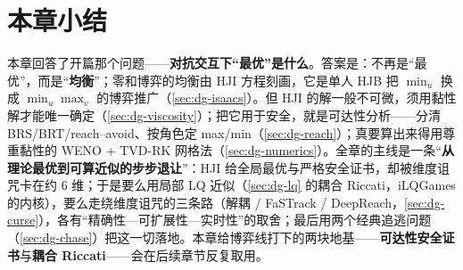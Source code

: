 \section*{本章小结}
本章回答了开篇那个问题——\textbf{对抗交互下“最优”是什么}。答案是：不再是“最优”，而是“\textbf{均衡}”；零和博弈的均衡由 HJI 方程刻画，它是单人 HJB 把 $\min_u$ 换成 $\min_u\max_v$ 的博弈推广（\cref{sec:dg-isaacs}）。但 HJI 的解一般不可微，须用黏性解才能唯一确定（\cref{sec:dg-viscosity}）；把它用于安全，就是可达性分析——分清 BRS/BRT/reach--avoid、按角色定 max/min（\cref{sec:dg-reach}）；真要算出来得用尊重黏性的 WENO + TVD-RK 网格法（\cref{sec:dg-numerics}）。全章的主线是一条“\textbf{从理论最优到可算近似的步步退让}”：HJI 给全局最优与严格安全证书，却被维度诅咒卡在约 6 维；于是要么用局部 LQ 近似（\cref{sec:dg-lq} 的耦合 Riccati，iLQGames 的内核），要么走绕维度诅咒的三条路（解耦 / FaSTrack / DeepReach，\cref{sec:dg-curse}），各有“精确性—可扩展性—实时性”的取舍；最后用两个经典追逃问题（\cref{sec:dg-chase}）把这一切落地。本章给博弈线打下的两块地基——\textbf{可达性安全证书}与\textbf{耦合 Riccati}——会在后续章节反复取用。


